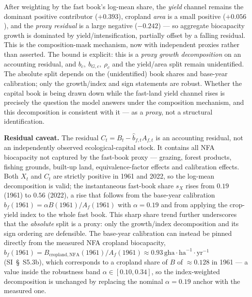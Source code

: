 \documentclass[11pt]{article}
\begin{document}
After weighting by the fast book's log-mean share, the \emph{yield} channel remains the dominant positive
contributor ($+0.393$), cropland \emph{area} is a small positive ($+0.056$), and the \emph{proxy residual} is a
large negative ($-0.242$) --- so aggregate biocapacity growth is dominated by yield/intensification, partially
offset by a falling residual. This is the composition-mask mechanism, now with independent proxies rather than
asserted. The bound is explicit: this is a \emph{proxy growth decomposition} on an accounting residual, and
$b_c,\ b_{G,c},\ \rho_c$ and the yield/area split remain unidentified. The absolute split depends on the
(unidentified) book shares and base-year calibration; only the growth/index and sign statements are robust.
Whether the capital book is being drawn down while the fast-land yield channel rises is precisely the question
the model answers under the composition mechanism, and this decomposition is consistent with it --- as a \emph{proxy}, not a structural identification.

\textbf{Residual caveat.} The residual $C_t=B_t-\hat b_{f,t}A_{f,t}$ is an accounting residual, not an
independently observed ecological-capital stock. It contains all NFA biocapacity not captured by the fast-book
proxy --- grazing, forest products, fishing grounds, built-up land, equivalence-factor effects and calibration
effects. Both $X_t$ and $C_t$ are strictly positive in 1961 and 2022, so the log-mean decomposition is valid; the
instantaneous fast-book share $s_X$ rises from $0.19$ (1961) to $0.56$ (2022), a rise that follows from the
base-year calibration $b_f(1961)=\alpha B(1961)/A_f(1961)$ with $\alpha=0.19$ and from applying the crop-yield
index to the whole fast book. This sharp share trend further underscores that the \emph{absolute} split is a
proxy: only the growth/index decomposition and its sign ordering are defensible. The base-year calibration can
instead be pinned directly from the measured NFA cropland biocapacity,
$b_f(1961)=B_{\mathrm{cropland,NFA}}(1961)/A_f(1961)\approx0.93\,\text{gha}\cdot\text{ha}^{-1}\cdot\text{yr}^{-1}$
(SI~\S\ S5.3b), which corresponds to a cropland share of $B$ of $\approx0.128$ in 1961 --- a value inside the
robustness band $\alpha\in[0.10,0.34]$, so the index-weighted decomposition is unchanged by replacing the
nominal $\alpha=0.19$ anchor with the measured one.
\end{document}
